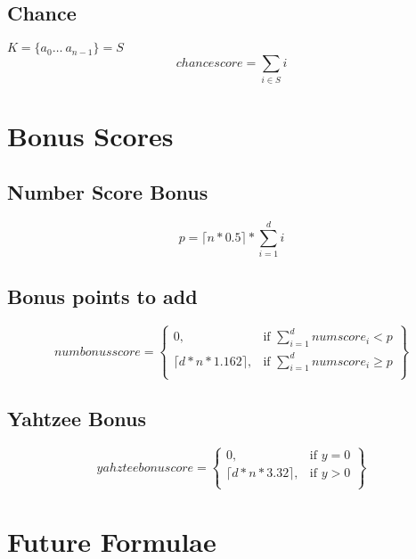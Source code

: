 \documentclass{article}
\begin{document}
\subsection{Chance}
$K = \{a_0 \dots\ a_{n-1}\} = S$
\begin{equation}
	chancescore=\displaystyle\sum_{i \in S} i
\end{equation}

\section{Bonus Scores}
\subsection{Number Score Bonus}
\begin{equation}
	\label{Points needed}
	p = \lceil n * 0.5 \rceil * \displaystyle\sum_{i=1} ^{d} i
\end{equation}

\subsection{Bonus points to add}
\begin{equation}
	\label{Points needed}
	numbonusscore = \left\{
    \begin{array}{lr}
        0, & \text{if } \displaystyle\sum_{i = 1} ^{d} numscore_i < p\\
        \lceil d * n * 1.162 \rceil, & \text{if } \displaystyle\sum_{i = 1} ^{d} numscore_i \geq p\\
    \end{array}
\right\}
\end{equation}

\subsection{Yahtzee Bonus}
\begin{equation}
yahzteebonuscore = 
\left\{
    \begin{array}{lr}
        0, & \text{if } y = 0\\
        \lceil d * n * 3.32 \rceil, & \text{if } y > 0\\
    \end{array}
\right\}
\end{equation}

\section{Future Formulae}
\end{document}
